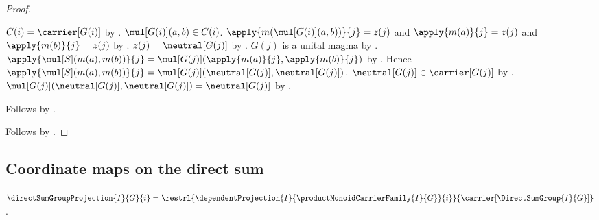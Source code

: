 \begin{proof}
\begin{subproof}
\begin{subproof}
\begin{byCase}
                $C(i)=\carrier[G(i)]$ by
                    .
                $\mul[G(i)](a,b)\in C(i)$.
                $\apply{m(\mul[G(i)](a,b))}{j}=z(j)$ and
                    $\apply{m(a)}{j}=z(j)$ and
                    $\apply{m(b)}{j}=z(j)$ by
                    .
                $z(j)=\neutral[G(j)]$ by
                    .
                $G(j)$ is a unital magma by
                    .
                $\apply{\mul[S](m(a),m(b))}{j}
                    =\mul[G(j)](\apply{m(a)}{j},\apply{m(b)}{j})$ by
                    .
                Hence $\apply{\mul[S](m(a),m(b))}{j}
                    =\mul[G(j)](\neutral[G(j)],\neutral[G(j)])$.
                $\neutral[G(j)]\in\carrier[G(j)]$ by
                    .
                $\mul[G(j)](\neutral[G(j)],\neutral[G(j)])
                    =\neutral[G(j)]$ by .
            \end{byCase}
        \end{subproof}
        Follows by .
    \end{subproof}
    Follows by .
\end{proof}

\subsection{Coordinate maps on the direct sum}

\begin{definition}\label{direct_sum_group_projection}
    $\directSumGroupProjection{I}{G}{i}
        =\restrl{\dependentProjection{I}{
            \productMonoidCarrierFamily{I}{G}}{i}}{
            \carrier[\DirectSumGroup{I}{G}]}$.
\end{definition}

